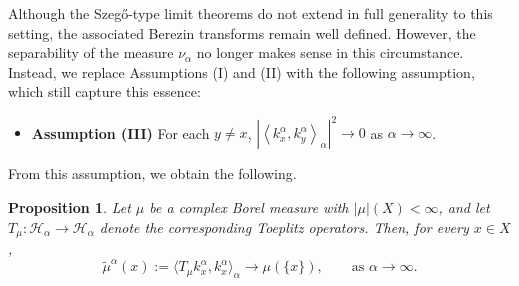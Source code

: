 \documentclass{amsart}
\newtheorem{prop}[thm]{Proposition}
\theoremstyle{definition}
\theoremstyle{remark}
\numberwithin{equation}{section}
\newcommand{\ip}[2]{\left\langle {#1} , {#2} \right\rangle} %
\begin{document}
Although the Szeg\H{o}-type limit theorems do not extend in full generality to this setting, the associated Berezin transforms remain well defined. However, the separability of the measure $\nu_{\alpha}$ no longer makes sense in this circumstance. Instead, we replace Assumptions (I) and (II) with the following assumption, which still capture this essence:
\begin{itemize}
    \item \textbf{Assumption (III)} For each $y\neq x$, $|\ip{k_{x}^{\alpha}}{k_{y}^{\alpha}}_{\alpha}|^{2}\to 0$ as $\alpha\to\infty$. 
\end{itemize}
From this assumption, we obtain the following. 

\begin{prop}
Let $\mu$ be a complex Borel measure with $|\mu|(X)<\infty$, and let $T_\mu:\mathcal{H}_\alpha\to\mathcal{H}_\alpha$ denote the corresponding Toeplitz operators. Then, for every $x\in X$,
\[
\widetilde{\mu}^\alpha(x)
:= \langle T_\mu k_x^\alpha, k_x^\alpha\rangle_\alpha
\longrightarrow \mu(\{x\}),
\qquad \text{as } \alpha\to\infty.
\]
\end{prop}
\end{document}

